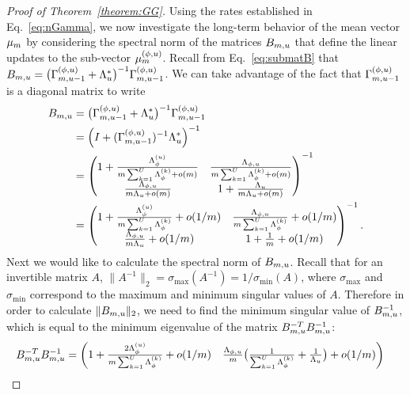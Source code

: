 \begin{proof}[Proof of Theorem~\ref{theorem:GG}]
Using the rates established in Eq.~\ref{eq:nGamma}, we now investigate the long-term behavior of the mean vector $\mu_m$ by considering the spectral norm of the matrices $B_{m, u}$ that define the linear updates to the sub-vector $\mu^{(\phi, u)}_{m}$.
Recall from Eq.~\ref{eq:submatB} that $B_{m, u} = \big(\Gamma^{(\phi, u)}_{m, u-1} + \Lambda^*_{u}\big)^{-1}\Gamma^{(\phi, u)}_{m, u-1}$. 
We can take advantage of the fact that $\Gamma^{(\phi, u)}_{m, u-1}$ is a diagonal matrix to write
\begin{align*}
  B_{m, u} &= \big(\Gamma^{(\phi, u)}_{m, u-1} + \Lambda^*_{u}\big)^{-1}\Gamma^{(\phi, u)}_{m, u-1} \\
  &= \Big(I + (\Gamma^{(\phi, u)}_{m, u-1})^{-1}\Lambda^*_{u}\Big)^{-1} \\
  &= \begin{pmatrix} 1 + \frac{\Lambda^{(u)}_{\phi}}{m\sum_{k = 1}^U\Lambda^{(k)}_{\phi} + o(m)} & \frac{\Lambda_{\phi, u}}{m\sum_{k = 1}^U\Lambda^{(k)}_{\phi} + o(m)} \\ 
  \frac{\Lambda_{\phi, u}}{m\Lambda_u + o(m)} & 1 + \frac{\Lambda_{u}}{m\Lambda_u + o(m)} \end{pmatrix}^{-1} \\
  &= \begin{pmatrix} 1 + \frac{\Lambda^{(u)}_{\phi}}{m\sum_{k = 1}^U\Lambda^{(k)}_{\phi}} + o(1/m) & \frac{\Lambda_{\phi, u}}{m\sum_{k = 1}^U\Lambda^{(k)}_{\phi}} + o(1/m)\\ 
  \frac{\Lambda_{\phi, u}}{m\Lambda_u} + o(1/m) & 1 + \frac{1}{m} + o(1/m) \end{pmatrix}^{-1}.
\end{align*}
Next we would like to calculate the spectral norm of $B_{m, u}$. 
Recall that for an invertible matrix $A$, $\|A^{-1}\|_2 = \sigma_{\max}(A^{-1}) = 1 / \sigma_{\min}(A)$, where $\sigma_{\max}$ and $\sigma_{\min}$ correspond to the maximum and minimum singular values of $A$.
Therefore in order to calculate $\|B_{m, u}\|_2$, we need to find the minimum singular value of $B^{-1}_{m, u}$, which is equal to the minimum eigenvalue of the matrix $B^{-T}_{m, u}B^{-1}_{m, u}$:
\begin{align*}
  B^{-T}_{m, u}B^{-1}_{m, u} &= \begin{pmatrix} 1 + \frac{2\Lambda^{(u)}_{\phi}}{m\sum_{k = 1}^U\Lambda^{(k)}_{\phi}} + o(1/m) & \frac{\Lambda_{\phi, u}}{m} \big(\frac{1}{\sum_{k = 1}^U\Lambda^{(k)}_{\phi}} + \frac{1}{\Lambda_u}\big) + o(1/m)\\ 

\end{pmatrix}
\end{align*}
\end{proof}
